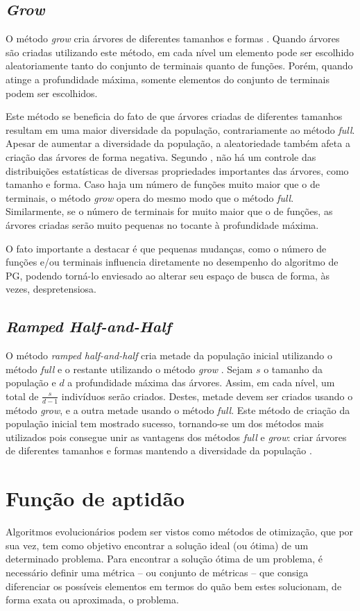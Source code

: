 \subsection{\textit{Grow}}
O método \textit{grow} cria árvores de diferentes tamanhos e formas \cite{koza1992}. Quando árvores são criadas utilizando este método, em cada nível um elemento pode ser escolhido aleatoriamente tanto do conjunto de terminais quanto de funções. Porém, quando atinge a profundidade máxima, somente elementos do conjunto de terminais podem ser escolhidos.

Este método se beneficia do fato de que árvores criadas de diferentes tamanhos resultam em uma maior diversidade da população, contrariamente ao método \textit{full}. Apesar de aumentar a diversidade da população, a aleatoriedade também afeta a criação das árvores de forma negativa. Segundo , não há um controle das distribuições estatísticas de diversas propriedades importantes das árvores, como tamanho e forma. Caso haja um número de funções muito maior que o de terminais, o método \textit{grow} opera do mesmo modo que o método \textit{full}. Similarmente, se o número de terminais for muito maior que o de funções, as árvores criadas serão muito pequenas no tocante à profundidade máxima.

O fato importante a destacar é que pequenas mudanças, como o número de funções e/ou terminais influencia diretamente no desempenho do algoritmo de PG, podendo torná-lo enviesado ao alterar seu espaço de busca de forma, às vezes, despretensiosa.

\subsection{\textit{Ramped Half-and-Half}}
O método \textit{ramped half-and-half} cria metade da população inicial utilizando o método \textit{full} e o restante utilizando o método \textit{grow} \cite{poli2008}. Sejam $s$ o tamanho da população e $d$ a profundidade máxima das árvores. Assim, em cada nível, um total de $\frac{s}{d-1}$ indivíduos serão criados. Destes, metade devem ser criados usando o método \textit{grow}, e a outra metade usando o método \textit{full}. Este método de criação da população inicial tem mostrado sucesso, tornando-se um dos métodos mais utilizados pois consegue unir as vantagens dos métodos \textit{full} e \textit{grow}: criar árvores de diferentes tamanhos e formas mantendo a diversidade da população \cite{koza1992}.

\section{Função de aptidão} \label{sec:fitness-functions}
Algoritmos evolucionários podem ser vistos como métodos de otimização, que por sua vez, tem como objetivo encontrar a solução ideal (ou ótima) de um determinado problema. Para encontrar a solução ótima de um problema, é necessário definir uma métrica -- ou conjunto de métricas -- que consiga diferenciar os possíveis elementos em termos do quão bem estes solucionam, de forma exata ou aproximada, o problema.

